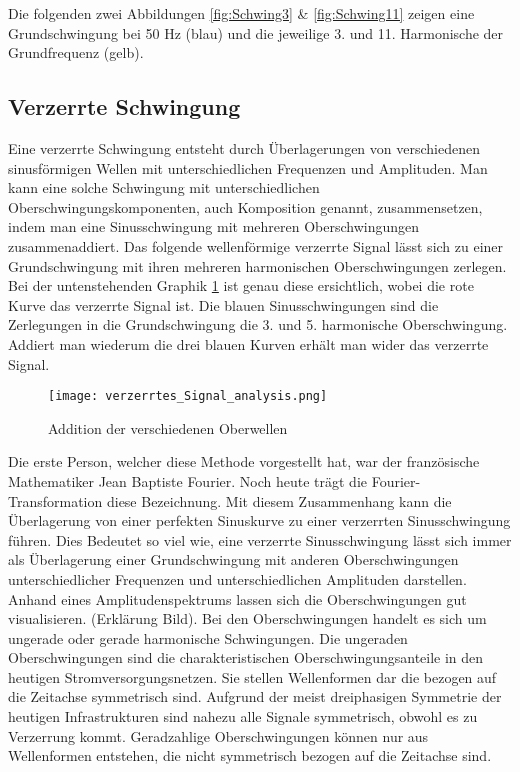 Die folgenden zwei Abbildungen \ref{fig:Schwing3} \& \ref{fig:Schwing11} zeigen eine Grundschwingung bei 50 Hz (blau) und die jeweilige 3. und 11. Harmonische der Grundfrequenz (gelb).

\subsection{Verzerrte Schwingung}
Eine verzerrte Schwingung entsteht durch Überlagerungen von verschiedenen sinusförmigen Wellen mit unterschiedlichen Frequenzen und Amplituden. Man kann eine solche Schwingung mit unterschiedlichen Oberschwingungskomponenten, auch Komposition genannt, zusammensetzen, indem man eine Sinusschwingung mit mehreren Oberschwingungen zusammenaddiert. Das folgende wellenförmige verzerrte Signal lässt sich zu einer Grundschwingung mit ihren mehreren harmonischen Oberschwingungen zerlegen. Bei der untenstehenden Graphik \ref{fig:Addition Oberwellen} ist genau diese ersichtlich, wobei die rote Kurve das verzerrte Signal ist. Die blauen Sinusschwingungen sind die Zerlegungen in die Grundschwingung die 3. und 5. harmonische Oberschwingung. Addiert man wiederum die drei blauen Kurven erhält man wider das verzerrte Signal.   

\begin{figure}[ht!]
	\centering
	\texttt{[image: verzerrtes\_Signal\_analysis.png]}	
	\caption{Addition der verschiedenen Oberwellen \cite{analysi3}}\label{fig:Addition Oberwellen}
\end{figure}


Die erste Person, welcher diese Methode vorgestellt hat, war der französische Mathematiker Jean Baptiste Fourier. Noch heute trägt die Fourier-Transformation diese Bezeichnung. Mit diesem Zusammenhang kann die Überlagerung von einer perfekten Sinuskurve zu einer verzerrten Sinusschwingung führen. Dies Bedeutet so viel wie, eine verzerrte Sinusschwingung lässt sich immer als Überlagerung einer Grundschwingung mit anderen Oberschwingungen unterschiedlicher Frequenzen und unterschiedlichen Amplituden darstellen. Anhand eines Amplitudenspektrums lassen sich die Oberschwingungen gut visualisieren. (Erklärung Bild).
Bei den Oberschwingungen handelt es sich um ungerade oder gerade harmonische Schwingungen.
Die ungeraden Oberschwingungen sind die charakteristischen Oberschwingungsanteile in den heutigen Stromversorgungsnetzen. Sie stellen Wellenformen dar die bezogen auf die Zeitachse symmetrisch sind. Aufgrund der meist dreiphasigen Symmetrie der heutigen Infrastrukturen sind nahezu alle Signale symmetrisch, obwohl es zu Verzerrung kommt. Geradzahlige Oberschwingungen können nur aus Wellenformen entstehen, die nicht symmetrisch bezogen auf die Zeitachse sind.

